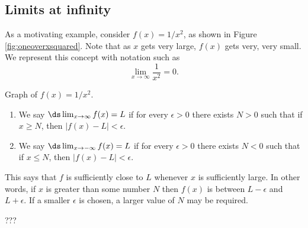 
\subsection*{Limits at infinity}

As a motivating example, consider $f(x) = 1/x^2$, as shown in Figure \ref{fig:oneoverxsquared}. Note that as $x$ gets very large, $f(x)$ gets very, very small. We represent this concept with notation such as $$\lim_{x\rightarrow \infty} \frac1{x^2}=0.$$

\begin{marginfigure}[1cm]
\caption{Graph of $f(x) = 1/x^2$. }\label{fig:oneoverxsquared}
\end{marginfigure}

 \label{precise.limit.infinity}
{\begin{enumerate}
\item We say $\ds\lim_{x\rightarrow\infty} f(x)=L$ if for every $\epsilon>0$ there exists $N>0$ such that if $x\geq N$, then $|f(x)-L|<\epsilon$. 

\item We say $\ds\lim_{x\rightarrow-\infty} f(x)=L$ if for every $\epsilon>0$ there exists $N<0$ such that if $x\leq N$, then $|f(x)-L|<\epsilon$.
\end{enumerate}
}

This says that $f$ is sufficiently close to $L$ whenever $x$ is sufficiently large. In other words, if $x$ is greater than some number $N$ then $f(x)$ is between $L-\epsilon$ and $L+\epsilon$. If a smaller $\epsilon$ is chosen, a larger value of $N$ may be required. 



\begin{summary}
\item ???
\end{summary}


\cleardoublepage
